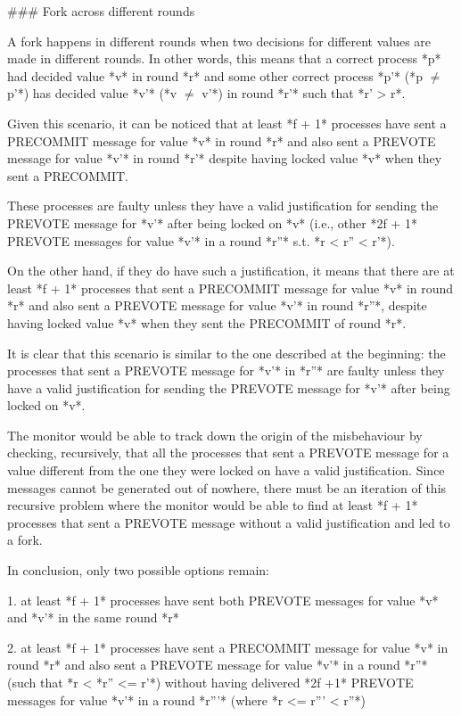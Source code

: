\documentclass[a4paper,11pt,oneside]{report}
\begin{document}
\begin{markdown}
### Fork across different rounds

A fork happens in different rounds when two decisions for different values are made in different rounds. 
In other words, this means that a correct process *p* had decided value *v* in round *r* and some other correct process *p'* (*p $\neq$ p'*) has decided value *v'* (*v $\neq$ v'*) in round *r'* such that *r' > r*. 

Given this scenario, it can be noticed that at least *f + 1* processes have sent a PRECOMMIT message for value *v* in round *r* and also sent a PREVOTE message for value *v'* in round *r'* despite having locked value *v* when they sent a PRECOMMIT.

These processes are faulty unless they have a valid justification for sending the PREVOTE message for *v'* after being locked on *v* (i.e., other *2f + 1* PREVOTE messages for value *v'* in a round *r''* s.t. *r < r'' < r'*).
 
On the other hand, if they do have such a justification, it means that there are at least *f + 1* processes that sent a PRECOMMIT message for value *v* in round *r* and also sent a PREVOTE message for value *v'* in round *r''*, despite having locked value *v* when they sent the PRECOMMIT of round *r*.

It is clear that this scenario is similar to the one described at the beginning: the processes that sent a PREVOTE message for *v'* in *r''* are faulty unless they have a valid justification for sending the PREVOTE message for *v'* after being locked on *v*.

The monitor would be able to track down the origin of the misbehaviour by checking, recursively, that all the processes that sent a PREVOTE message for a value different from the one they were locked on have a valid justification.
Since messages cannot be generated out of nowhere, there must be an iteration of this recursive problem where the monitor would be able to find at least *f + 1* processes that sent a PREVOTE message without a valid justification and led to a fork.

In conclusion, only two possible options remain:

1. at least *f + 1* processes have sent both PREVOTE messages for value *v* and *v'* in the same round *r*

2. at least *f + 1* processes have sent a PRECOMMIT message for value *v* in round *r* and also sent a PREVOTE message for value *v'* in a round *r''* (such that *r < *r'' <= r'*) without having delivered *2f +1* PREVOTE messages for value *v'* in a round *r'''* (where *r <= r''' < r''*)


\end{markdown}
\end{document}

